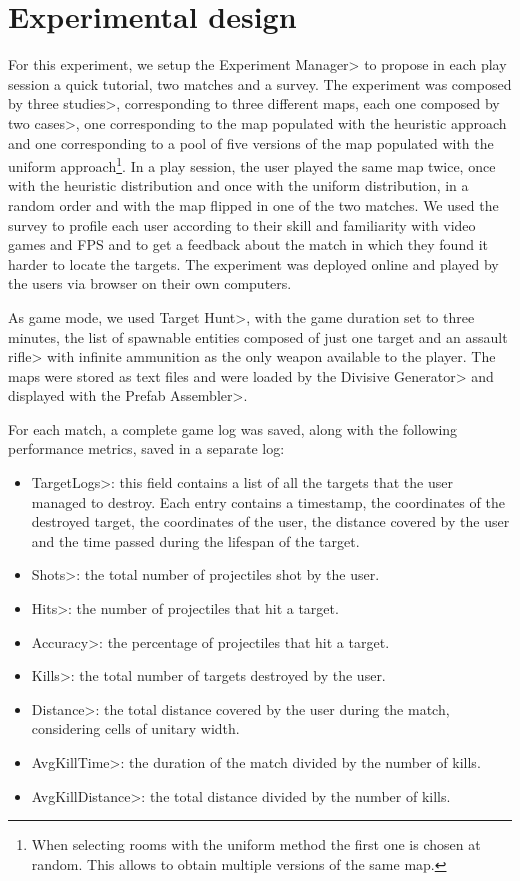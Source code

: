 
\section{Experimental design}

For this experiment, we setup the \<Experiment Manager> to propose in each play session a quick tutorial, two matches and a survey. The experiment was composed by three \<studies>, corresponding to three different maps, each one composed by two \<cases>, one corresponding to the map populated with the heuristic approach and one corresponding to a pool of five versions of the map populated with the uniform approach\footnote{When selecting rooms with the uniform method the first one is chosen at random. This allows to obtain multiple versions of the same map.}. In a play session, the user played the same map twice, once with the heuristic distribution and once with the uniform distribution, in a random order and with the map flipped in one of the two matches. We used the survey to profile each user according to their skill and familiarity with video games and FPS and to get a feedback about the match in which they found it harder to locate the targets. The experiment was deployed online and played by the users via browser on their own computers.

\par

As game mode, we used \<Target Hunt>, with the game duration set to three minutes, the list of spawnable entities composed of just one target and an \<assault rifle> with infinite ammunition as the only weapon available to the player. The maps were stored as text files and were loaded by the \<Divisive Generator> and displayed with the \<Prefab Assembler>. 

\par

For each match, a complete game log was saved, along with the following performance metrics, saved in a separate log:
\begin{itemize}
\item \<TargetLogs>: this field contains a list of all the targets that the user managed to destroy. Each entry contains a timestamp, the coordinates of the destroyed target, the coordinates of the user, the distance covered by the user and the time passed during the lifespan of the target.
\item \<Shots>: the total number of projectiles shot by the user.
\item \<Hits>: the number of projectiles that hit a target.
\item \<Accuracy>: the percentage of projectiles that hit a target.
\item \<Kills>: the total number of targets destroyed by the user.
\item \<Distance>: the total distance covered by the user during the match, considering cells of unitary width.
\item \<AvgKillTime>: the duration of the match divided by the number of kills.
\item \<AvgKillDistance>: the total distance divided by the number of kills.
\end{itemize}

